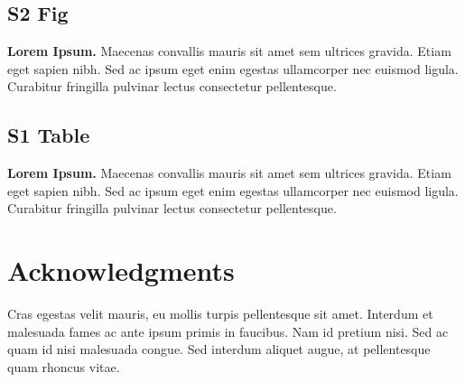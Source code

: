 \documentclass[10pt,letterpaper]{article}
\begin{document}
\subsection*{S2 Fig}
\label{S2_Fig}
{\bf Lorem Ipsum.} Maecenas convallis mauris sit amet sem ultrices gravida. Etiam eget sapien nibh. Sed ac ipsum eget enim egestas ullamcorper nec euismod ligula. Curabitur fringilla pulvinar lectus consectetur pellentesque.

\subsection*{S1 Table}
\label{S1_Table}
{\bf Lorem Ipsum.} Maecenas convallis mauris sit amet sem ultrices gravida. Etiam eget sapien nibh. Sed ac ipsum eget enim egestas ullamcorper nec euismod ligula. Curabitur fringilla pulvinar lectus consectetur pellentesque.

\section*{Acknowledgments}
Cras egestas velit mauris, eu mollis turpis pellentesque sit amet. Interdum et malesuada fames ac ante ipsum primis in faucibus. Nam id pretium nisi. Sed ac quam id nisi malesuada congue. Sed interdum aliquet augue, at pellentesque quam rhoncus vitae.

\nolinenumbers

%
%
% 

\end{document}
